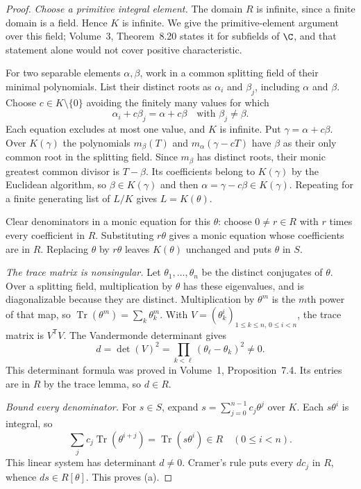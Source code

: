 \begin{proof}
\emph{Choose a primitive integral element.} The domain $R$ is infinite, since a finite domain is a field. Hence $K$ is infinite. We give the primitive-element argument over this field; Volume~3, Theorem~8.20 states it for subfields of $\C$, and that statement alone would not cover positive characteristic.

For two separable elements $\alpha,\beta$, work in a common splitting field of their minimal polynomials. List their distinct roots as $\alpha_i$ and $\beta_j$, including $\alpha$ and $\beta$. Choose $c\in K\setminus\{0\}$ avoiding the finitely many values for which
\[
 \alpha_i+c\beta_j=\alpha+c\beta\quad\text{with }\beta_j\ne\beta.
\]
Each equation excludes at most one value, and $K$ is infinite. Put $\gamma=\alpha+c\beta$. Over $K(\gamma)$ the polynomials $m_\beta(T)$ and $m_\alpha(\gamma-cT)$ have $\beta$ as their only common root in the splitting field. Since $m_\beta$ has distinct roots, their monic greatest common divisor is $T-\beta$. Its coefficients belong to $K(\gamma)$ by the Euclidean algorithm, so $\beta\in K(\gamma)$ and then $\alpha=\gamma-c\beta\in K(\gamma)$. Repeating for a finite generating list of $L/K$ gives $L=K(\theta)$.

Clear denominators in a monic equation for this $\theta$: choose $0\ne r\in R$ with $r$ times every coefficient in $R$. Substituting $r\theta$ gives a monic equation whose coefficients are in $R$. Replacing $\theta$ by $r\theta$ leaves $K(\theta)$ unchanged and puts $\theta$ in $S$.

\emph{The trace matrix is nonsingular.} Let $\theta_1,\ldots,\theta_n$ be the distinct conjugates of $\theta$. Over a splitting field, multiplication by $\theta$ has these eigenvalues, and is diagonalizable because they are distinct. Multiplication by $\theta^m$ is the $m$th power of that map, so
$\operatorname{Tr}(\theta^m)=\sum_k\theta_k^m$. With $V=(\theta_k^i)_{1\le k\le n,\,0\le i<n}$, the trace matrix is $V^{\mathsf T}V$. The Vandermonde determinant gives
\[
 d=\det(V)^2=\prod_{k<\ell}(\theta_\ell-\theta_k)^2\ne0.
\]
This determinant formula was proved in Volume~1, Proposition~7.4. Its entries are in $R$ by the trace lemma, so $d\in R$.

\emph{Bound every denominator.} For $s\in S$, expand $s=\sum_{j=0}^{n-1}c_j\theta^j$ over $K$. Each $s\theta^i$ is integral, so
\[
 \sum_j c_j\operatorname{Tr}(\theta^{i+j})
   =\operatorname{Tr}(s\theta^i)\in R
 \quad(0\le i<n).
\]
This linear system has determinant $d\ne0$. Cramer's rule puts every $dc_j$ in $R$, whence $ds\in R[\theta]$. This proves (a).


\end{proof}
